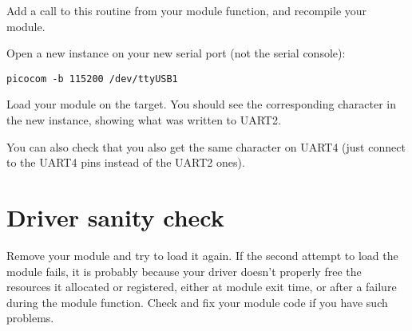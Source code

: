Add a call to this routine from your module  function,
and recompile your module.

Open a new  instance on your new serial port (not the
serial console):

\begin{verbatim}
picocom -b 115200 /dev/ttyUSB1
\end{verbatim}

Load your module on the target. You should see the
corresponding character in the new  instance,
showing what was written to UART2.

You can also check that you also get the same character on UART4
(just connect to the UART4 pins instead of the UART2 ones).

\section{Driver sanity check}

Remove your module and try to load it again. If the second attempt to
load the module fails, it is probably because your driver doesn't
properly free the resources it allocated or registered, either at module
exit time, or after a failure during the module  function. Check
and fix your module code if you have such problems.
